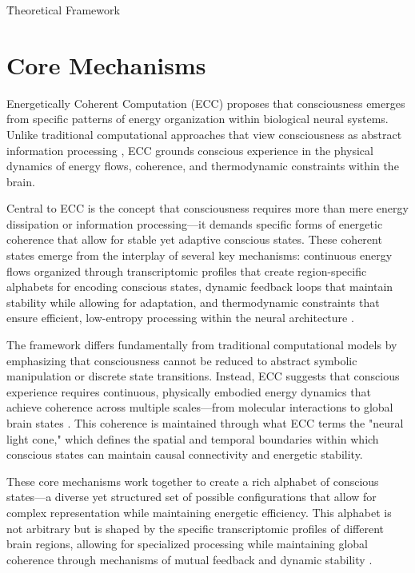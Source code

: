 \h{Theoretical Framework}
\section{Core Mechanisms}

\begin{refsection}

Energetically Coherent Computation (ECC) proposes that consciousness emerges from specific patterns of energy organization within biological neural systems. Unlike traditional computational approaches that view consciousness as abstract information processing \cite{dehaene2014toward}, ECC grounds conscious experience in the physical dynamics of energy flows, coherence, and thermodynamic constraints within the brain.

Central to ECC is the concept that consciousness requires more than mere energy dissipation or information processing—it demands specific forms of energetic coherence that allow for stable yet adaptive conscious states. These coherent states emerge from the interplay of several key mechanisms: continuous energy flows organized through transcriptomic profiles that create region-specific alphabets for encoding conscious states, dynamic feedback loops that maintain stability while allowing for adaptation, and thermodynamic constraints that ensure efficient, low-entropy processing within the neural architecture \cite{varela2001brainweb}.

The framework differs fundamentally from traditional computational models by emphasizing that consciousness cannot be reduced to abstract symbolic manipulation or discrete state transitions. Instead, ECC suggests that conscious experience requires continuous, physically embodied energy dynamics that achieve coherence across multiple scales—from molecular interactions to global brain states \cite{buzsaki2006rhythms}. This coherence is maintained through what ECC terms the "neural light cone," which defines the spatial and temporal boundaries within which conscious states can maintain causal connectivity and energetic stability.

These core mechanisms work together to create a rich alphabet of conscious states—a diverse yet structured set of possible configurations that allow for complex representation while maintaining energetic efficiency. This alphabet is not arbitrary but is shaped by the specific transcriptomic profiles of different brain regions, allowing for specialized processing while maintaining global coherence through mechanisms of mutual feedback and dynamic stability \cite{hasson2015hierarchical}.


\end{refsection}
